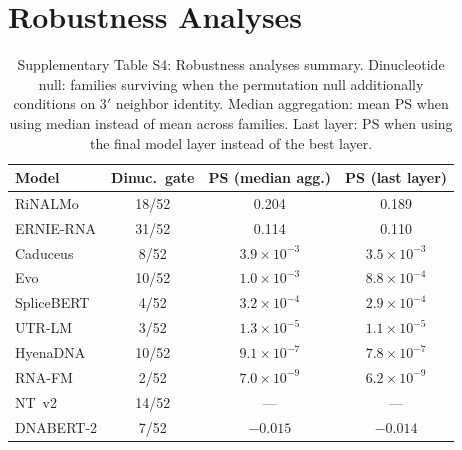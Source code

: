 \documentclass[11pt]{article}
\begin{document}
\clearpage

\section{Robustness Analyses}
\label{supp:robustness}

\begin{table}[htbp]
\centering
\caption{Supplementary Table S4: Robustness analyses summary. Dinucleotide null: families surviving when the permutation null additionally conditions on 3$'$ neighbor identity. Median aggregation: mean PS when using median instead of mean across families. Last layer: PS when using the final model layer instead of the best layer.}
\label{tab:s4}
\small
\begin{tabular}{lccc}
\toprule
\textbf{Model} & \textbf{Dinuc.\ gate} & \textbf{PS (median agg.)} & \textbf{PS (last layer)} \\
\midrule
RiNALMo & 18/52 & 0.204 & 0.189 \\
ERNIE-RNA & 31/52 & 0.114 & 0.110 \\
Caduceus & 8/52 & $3.9 \times 10^{-3}$ & $3.5 \times 10^{-3}$ \\
Evo & 10/52 & $1.0 \times 10^{-3}$ & $8.8 \times 10^{-4}$ \\
SpliceBERT & 4/52 & $3.2 \times 10^{-4}$ & $2.9 \times 10^{-4}$ \\
UTR-LM & 3/52 & $1.3 \times 10^{-5}$ & $1.1 \times 10^{-5}$ \\
HyenaDNA & 10/52 & $9.1 \times 10^{-7}$ & $7.8 \times 10^{-7}$ \\
RNA-FM & 2/52 & $7.0 \times 10^{-9}$ & $6.2 \times 10^{-9}$ \\
NT~v2 & 14/52 & --- & --- \\
DNABERT-2 & 7/52 & $-0.015$ & $-0.014$ \\
\bottomrule
\end{tabular}
\end{table}
\end{document}
